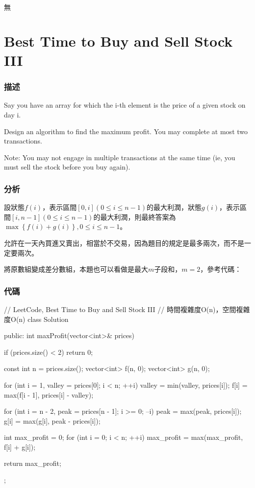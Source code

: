 \begindot
\item 無
\myenddot


\section{Best Time to Buy and Sell Stock III} %
\label{sec:best-time-to-buy-and-sell-stock-iii}


\subsubsection{描述}
Say you have an array for which the i-th element is the price of a given stock on day i.

Design an algorithm to find the maximum profit. You may complete at most two transactions.

Note: You may not engage in multiple transactions at the same time (ie, you must sell the stock before you buy again).


\subsubsection{分析}
設狀態$f(i)$，表示區間$[0,i](0 \leq i \leq n-1)$的最大利潤，狀態$g(i)$，表示區間$[i, n-1](0 \leq i \leq n-1)$的最大利潤，則最終答案為$\max\left\{f(i)+g(i)\right\},0 \leq i \leq n-1$。

允許在一天內買進又賣出，相當於不交易，因為題目的規定是最多兩次，而不是一定要兩次。

將原數組變成差分數組，本題也可以看做是最大$m$子段和，$m=2$，參考代碼：

\subsubsection{代碼}
\begin{Code}
// LeetCode, Best Time to Buy and Sell Stock III
// 時間複雜度O(n)，空間複雜度O(n)
class Solution {
public:
    int maxProfit(vector<int>& prices) {
        if (prices.size() < 2) return 0;

        const int n = prices.size();
        vector<int> f(n, 0);
        vector<int> g(n, 0);

        for (int i = 1, valley = prices[0]; i < n; ++i) {
            valley = min(valley, prices[i]);
            f[i] = max(f[i - 1], prices[i] - valley);
        }

        for (int i = n - 2, peak = prices[n - 1]; i >= 0; --i) {
            peak = max(peak, prices[i]);
            g[i] = max(g[i], peak - prices[i]);
        }

        int max_profit = 0;
        for (int i = 0; i < n; ++i)
            max_profit = max(max_profit, f[i] + g[i]);

        return max_profit;
    }
};
\end{Code}


